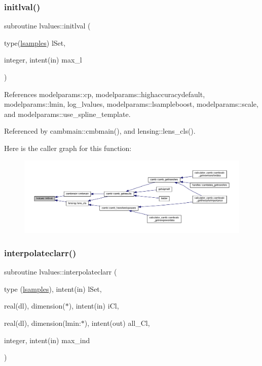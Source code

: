 \subsubsection{\texorpdfstring{initlval()}{initlval()}}
{\footnotesize\ttfamily subroutine lvalues\+::initlval (\begin{DoxyParamCaption}\item[{type(\mbox{\hyperlink{structlvalues_1_1lsamples}{lsamples}})}]{l\+Set,  }\item[{integer, intent(in)}]{max\+\_\+l }\end{DoxyParamCaption})}



References modelparams\+::cp, modelparams\+::highaccuracydefault, modelparams\+::lmin, log\+\_\+lvalues, modelparams\+::lsampleboost, modelparams\+::scale, and modelparams\+::use\+\_\+spline\+\_\+template.



Referenced by cambmain\+::cmbmain(), and lensing\+::lens\+\_\+cls().

Here is the caller graph for this function\+:
\nopagebreak
\begin{figure}[H]
\begin{center}
\leavevmode
\includegraphics[width=350pt]{namespacelvalues_aae4ab5512d16abd3d2f2857fe806e012_icgraph}
\end{center}
\end{figure}
\mbox{\label{namespacelvalues_a62105cb97d67654d96481cbb8fe54240}} 
\subsubsection{\texorpdfstring{interpolateclarr()}{interpolateclarr()}}
{\footnotesize\ttfamily subroutine lvalues\+::interpolateclarr (\begin{DoxyParamCaption}\item[{type (\mbox{\hyperlink{structlvalues_1_1lsamples}{lsamples}}), intent(in)}]{l\+Set,  }\item[{real(dl), dimension($\ast$), intent(in)}]{i\+Cl,  }\item[{real(dl), dimension(lmin\+:$\ast$), intent(out)}]{all\+\_\+\+Cl,  }\item[{integer, intent(in)}]{max\+\_\+ind }\end{DoxyParamCaption})}




